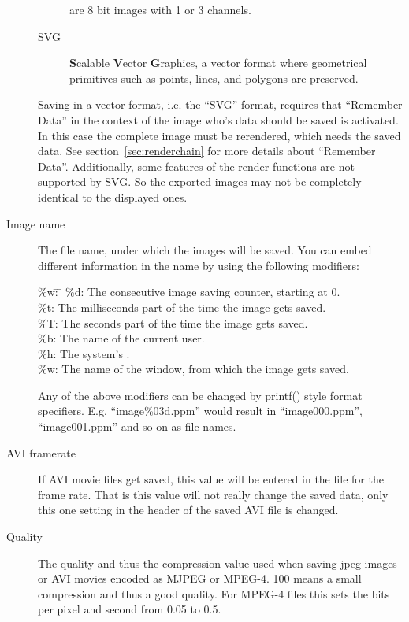 \begin{description}
\begin{description}
    are 8 bit images with 1 or 3 channels.
  \item[SVG\index{Image format!SVG}] {\bf S}calable {\bf V}ector
    {\bf G}raphics, a vector format where geometrical primitives
    such as points, lines, and polygons are preserved.
  \end{description}
  Saving in a vector format, i.e. the ``SVG'' format, requires that
  ``Remember Data'' in the context of the image who's data should
  be saved is activated. In this case the complete image must be
  rerendered, which needs the saved data. See
  section~\ref{sec:renderchain} for more details about ``Remember
  Data''. Additionally, some features of the \icewing{} render
  functions are not supported by SVG. So the exported images may not
  be completely identical to the displayed ones.

\item[Image name] The file name, under which the images will be
  saved. You can embed different information in the name by using
  the following modifiers:
  \begin{tabbing}
    \%w\=: \= \kill
    \%d\>:\> The consecutive image saving counter, starting at 0.\\
    \%t\>:\> The milliseconds part of the time the image gets saved.\\
    \%T\>:\> The seconds part of the time the image gets saved.\\
    \%b\>:\> The name of the current user.\\
    \%h\>:\> The system's .\\
    \%w\>:\> The name of the window, from which the image gets saved.
  \end{tabbing}
  Any of the above modifiers can be changed by printf() style format
  specifiers. E.g. ``image\%03d.ppm'' would result in
  ``image000.ppm'', ``image001.ppm'' and so on as file names.

\item[AVI framerate] If AVI movie files get saved, this value will
  be entered in the file for the frame rate. That is this value will
  not really change the saved data, only this one setting in the
  header of the saved AVI file is changed.

\item[Quality] The quality and thus the compression value used when
  saving jpeg images or AVI movies encoded as MJPEG or MPEG-4. 100
  means a small compression and thus a good quality. For MPEG-4
  files this sets the bits per pixel and second from 0.05 to 0.5.


\end{description}

